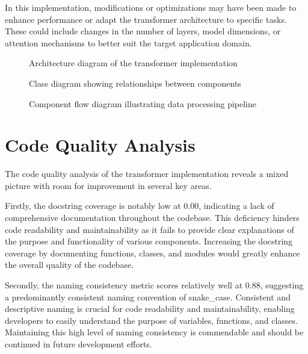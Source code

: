 \documentclass[a4paper,11pt]{article}
\begin{document}
In this implementation, modifications or optimizations may have been made to enhance performance or adapt the transformer architecture to specific tasks. These could include changes in the number of layers, model dimensions, or attention mechanisms to better suit the target application domain.

\begin{figure}[htbp]
\centering

\caption{Architecture diagram of the transformer implementation}
\label{fig:architecture}
\end{figure}

\begin{figure}[htbp]
\centering

\caption{Class diagram showing relationships between components}
\label{fig:class_diagram}
\end{figure}

\begin{figure}[htbp]
\centering

\caption{Component flow diagram illustrating data processing pipeline}
\label{fig:component_flow}
\end{figure}

\section{Code Quality Analysis}
The code quality analysis of the transformer implementation reveals a mixed picture with room for improvement in several key areas. 

Firstly, the docstring coverage is notably low at 0.00, indicating a lack of comprehensive documentation throughout the codebase. This deficiency hinders code readability and maintainability as it fails to provide clear explanations of the purpose and functionality of various components. Increasing the docstring coverage by documenting functions, classes, and modules would greatly enhance the overall quality of the codebase.

Secondly, the naming consistency metric scores relatively well at 0.88, suggesting a predominantly consistent naming convention of snake\_case. Consistent and descriptive naming is crucial for code readability and maintainability, enabling developers to easily understand the purpose of variables, functions, and classes. Maintaining this high level of naming consistency is commendable and should be continued in future development efforts.
\end{document}
